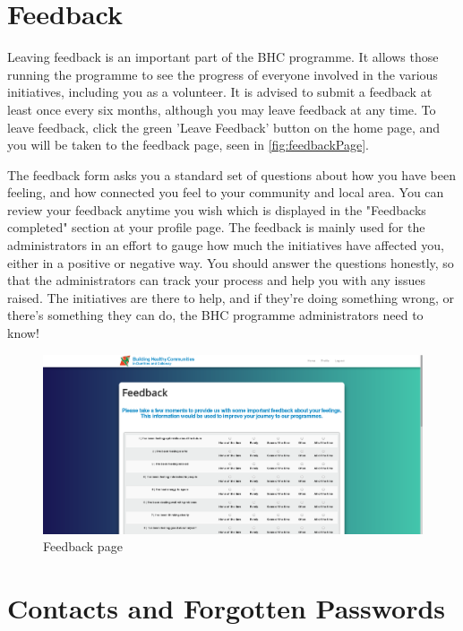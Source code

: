 \documentclass{bhcguides}
\begin{document}
\pagebreak

\section{Feedback}
\label{sec:feedback}

Leaving feedback is an important part of the BHC programme. It allows those running the programme to see the progress of everyone involved in the various initiatives, including you as a volunteer. It is advised to submit a feedback at least once every six months, although you may leave feedback at any time. To leave feedback, click the green 'Leave Feedback' button on the home page, and you will be taken to the feedback page, seen in \autoref{fig:feedbackPage}.

The feedback form asks you a standard set of questions about how you have been feeling, and how connected you feel to your community and local area. You can review your feedback anytime you wish which is displayed in the "Feedbacks completed" section at your profile page. The feedback is mainly used for the administrators in an effort to gauge how much the initiatives have affected you, either in a positive or negative way. You should answer the questions honestly, so that the administrators can track your process and help you with any issues raised. The initiatives are there to help, and if they're doing something wrong, or there's something they can do, the BHC programme administrators need to know!

\begin{figure}[h]
 \centerline{\includegraphics[width=\textwidth, height=\textheight, keepaspectratio]{feedbackpage.png}}
 \caption{Feedback page}
 \label{fig:feedbackPage}
\end{figure}

\pagebreak

\section{Contacts and Forgotten Passwords}
\label{sec:contacts}
\end{document}
